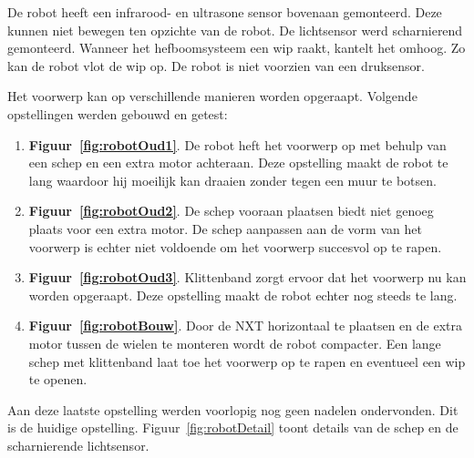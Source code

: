 \documentclass[eind]{penoverslag}
\begin{document}
De robot heeft een infrarood- en ultrasone sensor bovenaan gemonteerd. Deze kunnen niet bewegen ten opzichte van de robot. De lichtsensor werd scharnierend gemonteerd. Wanneer het hefboomsysteem een wip raakt, kantelt het omhoog. Zo kan de robot vlot de wip op.
De robot is niet voorzien van een druksensor.

Het voorwerp kan op verschillende manieren worden opgeraapt. Volgende opstellingen werden gebouwd en getest:

\begin{enumerate}
\item \textbf{Figuur~\ref{fig:robotOud1}}. De robot heft het voorwerp op met behulp van een schep en een extra motor achteraan. Deze opstelling maakt de robot te lang waardoor hij moeilijk kan draaien zonder tegen een muur te botsen.
\item \textbf{Figuur~\ref{fig:robotOud2}}. De schep vooraan plaatsen biedt niet genoeg plaats voor een extra motor. De schep aanpassen aan de vorm van het voorwerp is echter niet voldoende om het voorwerp succesvol op te rapen.
\item \textbf{Figuur~\ref{fig:robotOud3}}. Klittenband zorgt ervoor dat het voorwerp nu kan worden opgeraapt. Deze opstelling maakt de robot echter nog steeds te lang.
\item \textbf{Figuur~\ref{fig:robotBouw}}. Door de \textsc{NXT} horizontaal te plaatsen en de extra motor tussen de wielen te monteren wordt de robot compacter. Een lange schep met klittenband laat toe het voorwerp op te rapen en eventueel een wip te openen.
\end{enumerate}

Aan deze laatste opstelling werden voorlopig nog geen nadelen ondervonden. Dit is de huidige opstelling. Figuur~\ref{fig:robotDetail} toont details van de schep en de scharnierende lichtsensor.
\end{document}
